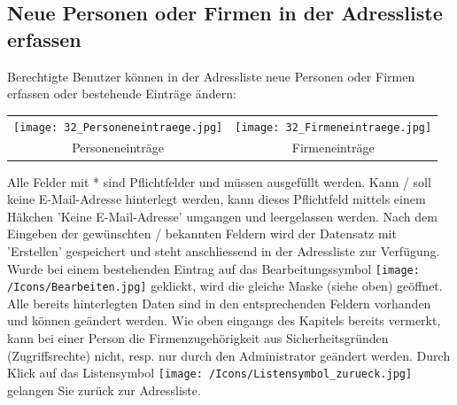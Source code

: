 \subsection{Neue Personen oder Firmen in der Adressliste erfassen}
Berechtigte Benutzer können in der Adressliste neue Personen oder Firmen erfassen oder bestehende Einträge ändern:

\vspace{\baselineskip}

\begin{tabular}{cc} %
\texttt{[image: 32\_Personeneintraege.jpg]} & \texttt{[image: 32\_Firmeneintraege.jpg]} \\
Personeneinträge & Firmeneinträge \\
\end{tabular}


\vspace{\baselineskip}
Alle Felder mit * sind Pflichtfelder und müssen ausgefüllt werden. Kann / soll keine E-Mail-Adresse hinterlegt werden, kann dieses Pflichtfeld mittels einem Häkchen 'Keine E-Mail-Adresse'  umgangen und leergelassen werden. Nach dem Eingeben der gewünschten / bekannten Feldern wird der Datensatz mit 'Erstellen'  gespeichert und steht anschliessend in der Adressliste zur Verfügung. Wurde bei einem bestehenden Eintrag auf das Bearbeitungssymbol \texttt{[image: /Icons/Bearbeiten.jpg]} geklickt, wird die gleiche Maske (siehe oben) geöffnet. Alle bereits hinterlegten Daten sind in den entsprechenden Feldern vorhanden und können geändert werden. Wie oben eingangs des Kapitels bereits vermerkt, kann bei einer Person die Firmenzugehörigkeit aus Sicherheitsgründen (Zugriffsrechte) nicht, resp. nur durch den Administrator geändert werden.\newline
Durch Klick auf das Listensymbol \texttt{[image: /Icons/Listensymbol\_zurueck.jpg]}  gelangen Sie zurück zur Adressliste.
